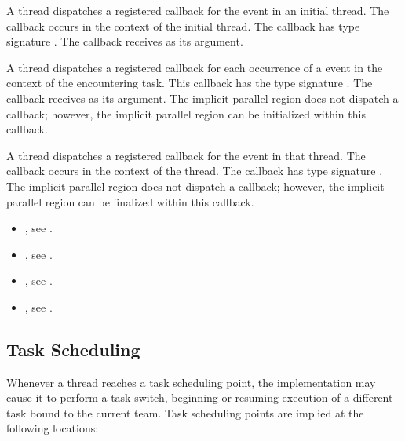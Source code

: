 \tools

A thread dispatches a registered 
callback for the  event in an initial thread.
The callback occurs in the context of the initial thread.
The callback has type signature .
The callback receives  as its  argument.

A thread dispatches a registered 
callback for each occurrence of a  event
in the context of the encountering task.  This callback has the type signature
.
The callback receives  as its  argument.
The implicit parallel region does not dispatch a  callback;
however, the implicit parallel region can be initialized within this 
callback.

A thread dispatches a registered 
callback for the  event in that thread.
The callback occurs in the context of the thread.  The callback has type signature
.
The implicit parallel region does not dispatch a  callback;
however, the implicit parallel region can be finalized within this 
callback.

\crossreferences
\begin{itemize}

\item {}, see
.

\item {}, see
  .

\item {}, see
  .

\item {}, see
.


\end{itemize}

\subsection{Task Scheduling}
\label{subsec:Task Scheduling}
Whenever a thread reaches a task scheduling point, the implementation may cause it to
perform a task switch, beginning or resuming execution of a different task bound to the
current team. Task scheduling points are implied at the following locations:

